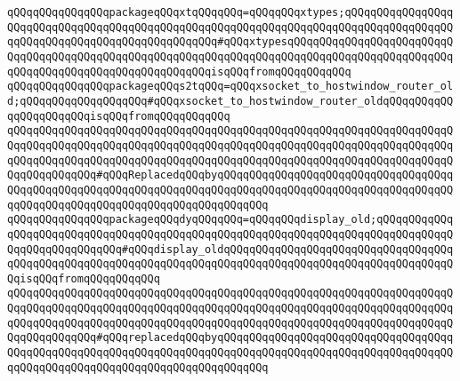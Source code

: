 \verb|qQQqqQQqqQQqqQQqpackageqQQqxtqQQqqQQq=qQQqqQQqxtypes;qQQqqQQqqQQqqQQqqQQqqQQqqQQqqQQqqQQqqQQqqQQqqQQqqQQqqQQqqQQqqQQqqQQqqQQqqQQqqQQqqQQqqQQqqQQqqQQqqQQqqQQqqQQqqQQqqQQqqQQq#qQQqxtypesqQQqqQQqqQQqqQQqqQQqqQQqqQQqqQQqqQQqqQQqqQQqqQQqqQQqqQQqqQQqqQQqqQQqqQQqqQQqqQQqqQQqqQQqqQQqqQQqqQQqqQQqqQQqqQQqqQQqqQQqqQQqqQQqisqQQqfromqQQqqQQqqQQq|\newline
\newline
\verb|qQQqqQQqqQQqqQQqpackageqQQqs2tqQQq=qQQqxsocket_to_hostwindow_router_old;qQQqqQQqqQQqqQQqqQQq#qQQqxsocket_to_hostwindow_router_oldqQQqqQQqqQQqqQQqqQQqqQQqisqQQqfromqQQqqQQqqQQq|\newline
\verb|qQQqqQQqqQQqqQQqqQQqqQQqqQQqqQQqqQQqqQQqqQQqqQQqqQQqqQQqqQQqqQQqqQQqqQQqqQQqqQQqqQQqqQQqqQQqqQQqqQQqqQQqqQQqqQQqqQQqqQQqqQQqqQQqqQQqqQQqqQQqqQQqqQQqqQQqqQQqqQQqqQQqqQQqqQQqqQQqqQQqqQQqqQQqqQQqqQQqqQQqqQQqqQQqqQQqqQQqqQQqqQQq#qQQqReplacedqQQqbyqQQqqQQqqQQqqQQqqQQqqQQqqQQqqQQqqQQqqQQqqQQqqQQqqQQqqQQqqQQqqQQqqQQqqQQqqQQqqQQqqQQqqQQqqQQqqQQqqQQqqQQqqQQqqQQqqQQqqQQqqQQqqQQqqQQqqQQqqQQqqQQqqQQq|\newline
\newline
\verb|qQQqqQQqqQQqqQQqpackageqQQqdyqQQqqQQq=qQQqqQQqdisplay_old;qQQqqQQqqQQqqQQqqQQqqQQqqQQqqQQqqQQqqQQqqQQqqQQqqQQqqQQqqQQqqQQqqQQqqQQqqQQqqQQqqQQqqQQqqQQqqQQqqQQq#qQQqdisplay_oldqQQqqQQqqQQqqQQqqQQqqQQqqQQqqQQqqQQqqQQqqQQqqQQqqQQqqQQqqQQqqQQqqQQqqQQqqQQqqQQqqQQqqQQqqQQqqQQqqQQqqQQqqQQqisqQQqfromqQQqqQQqqQQq|\newline
\verb|qQQqqQQqqQQqqQQqqQQqqQQqqQQqqQQqqQQqqQQqqQQqqQQqqQQqqQQqqQQqqQQqqQQqqQQqqQQqqQQqqQQqqQQqqQQqqQQqqQQqqQQqqQQqqQQqqQQqqQQqqQQqqQQqqQQqqQQqqQQqqQQqqQQqqQQqqQQqqQQqqQQqqQQqqQQqqQQqqQQqqQQqqQQqqQQqqQQqqQQqqQQqqQQqqQQqqQQqqQQqqQQq#qQQqreplacedqQQqbyqQQqqQQqqQQqqQQqqQQqqQQqqQQqqQQqqQQqqQQqqQQqqQQqqQQqqQQqqQQqqQQqqQQqqQQqqQQqqQQqqQQqqQQqqQQqqQQqqQQqqQQqqQQqqQQqqQQqqQQqqQQqqQQqqQQqqQQqqQQqqQQqqQQq|\newline
\newline

